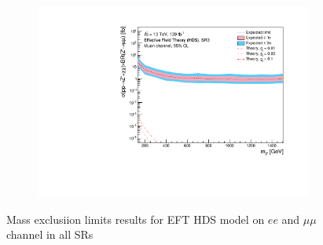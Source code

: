 \documentclass[12pt, a4paper]{book}
\begin{document}
\begin{figure}[!ht]
\begin{subfigure}[b]{0.49\textwidth}
   \end{subfigure}
   \hfill
   \begin{subfigure}[b]{0.49\textwidth}
      \centering
      \includegraphics[width=1\textwidth]{Limits/Model_independent/150/EFT_HDS/mass_exclusion_uu.pdf}
   \end{subfigure}
   \caption{Mass exclusiion limits results for EFT HDS model on $ee$ and $\mu\mu$ channel in all SRs}\label{fig:EFT_HDS_me_SRS}
\end{figure}
\end{document}
